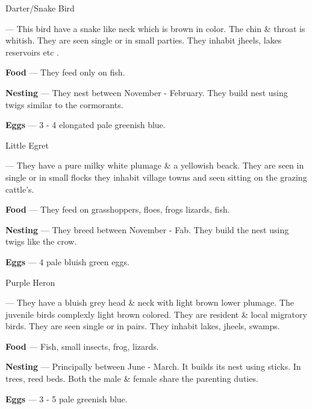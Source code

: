 \begin{bird}{Darter/Snake Bird}

 --- This bird have a snake like neck which is brown in color. The chin \& throat is whitish. They are seen single or in small parties. They inhabit jheels, lakes reservoirs etc .

{\large\bf Food} --- They feed only on fish. 

{\large\bf Nesting} --- They nest between November - February. They build nest using twigs similar to the cormorants.

{\large\bf Eggs} --- 3 - 4 elongated pale greenish blue.
\end{bird}

\begin{bird}{Little Egret}

 --- They have a pure milky white plumage \& a yellowish beack. They are seen in single or in small flocks they inhabit village towns and seen sitting on the grazing cattle's.

{\large\bf Food} --- They feed on grasshoppers, floes, frogs lizards, fish.

{\large\bf Nesting} --- They breed between November - Fab. They build the nest using twigs like the crow.

{\large\bf Eggs} --- 4 pale bluish green eggs.
\end{bird}

\begin{bird}{Purple Heron}

 --- They have a bluish grey head \& neck with light brown lower plumage. The juvenile birds complexly light brown colored. They are resident \& local migratory birds. They are seen single or in pairs. They inhabit lakes, jheels, swamps.

{\large\bf Food} --- Fish, small insects, frog, lizards.

{\large\bf Nesting} --- Principally between June - March. It builds its nest using sticks. In trees, reed beds. Both the male \& female share the parenting duties.

{\large\bf Eggs} --- 3 - 5 pale greenish blue.
\end{bird}

